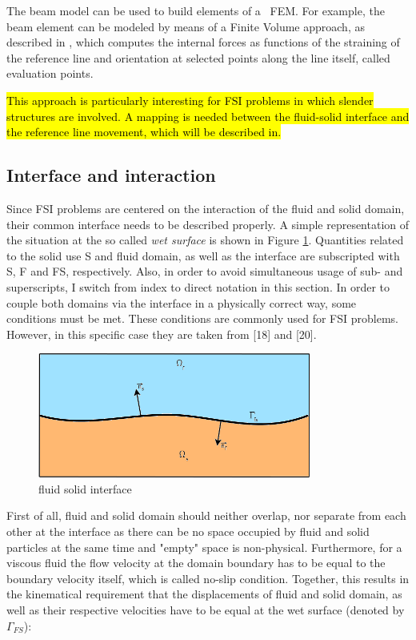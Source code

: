 The beam model can be used to build elements of a ~\ac{FEM}. For example, the beam element can be modeled by means of a Finite Volume approach, as described in \cite{ghiringhelli2000multibody}, which computes the internal forces as functions of the straining of the reference line and orientation at selected points along the line itself, called evaluation points.

\hl{This approach is particularly interesting for FSI problems in which slender structures are involved. A mapping is needed between the fluid-solid interface and the reference line movement, which will be described in.}


\subsection{Interface and interaction}
\label{sec:interface}

Since FSI problems are centered on the interaction of the fluid and solid domain, their common interface needs to be described properly. A simple representation of the situation at the so called \textit{wet surface} is shown in Figure \ref{fig:interface}. Quantities related to the solid use S and fluid domain, as well as the interface are subscripted
with S, F and FS, respectively. Also, in order to avoid simultaneous usage of sub- and superscripts, I
switch from index to direct notation in this section. In order to couple both domains via the interface
in a physically correct way, some conditions must be met. These conditions are commonly used for FSI
problems. However, in this specific case they are taken from [18] and [20].

\begin{figure}[htbp!]
	\centering
	\includegraphics[width=0.8\textwidth]{images/interface}
	\caption{fluid solid interface}
	\label{fig:interface}
\end{figure}


First of all, fluid and solid domain should neither overlap, nor separate from each other at the interface
as there can be no space occupied by fluid and solid particles at the same time and "empty" space is non-physical. Furthermore, for a viscous fluid the flow velocity at the domain boundary has to be equal
to the boundary velocity itself, which is called no-slip condition. Together, this results in the kinematical
requirement that the displacements of fluid and solid domain, as well as their respective velocities have
to be equal at the wet surface (denoted by $\Gamma_{FS}$):

